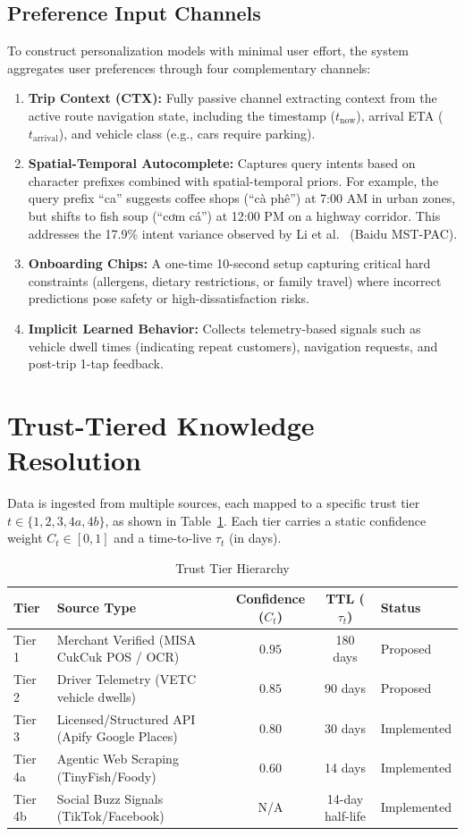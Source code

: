 \documentclass[acmsmall,screen]{acmart}
\begin{document}
\subsection{Preference Input Channels}
To construct personalization models with minimal user effort, the system aggregates user preferences through four complementary channels:
\begin{enumerate}
    \item \textbf{Trip Context (CTX):} Fully passive channel extracting context from the active route navigation state, including the timestamp ($t_{\text{now}}$), arrival ETA ($t_{\text{arrival}}$), and vehicle class (e.g., cars require parking).
    \item \textbf{Spatial-Temporal Autocomplete:} Captures query intents based on character prefixes combined with spatial-temporal priors. For example, the query prefix ``ca'' suggests coffee shops (``cà phê'') at 7:00 AM in urban zones, but shifts to fish soup (``cơm cá'') at 12:00 PM on a highway corridor. This addresses the 17.9\% intent variance observed by Li et al.~\cite{li2020baidu} (Baidu MST-PAC).
    \item \textbf{Onboarding Chips:} A one-time 10-second setup capturing critical hard constraints (allergens, dietary restrictions, or family travel) where incorrect predictions pose safety or high-dissatisfaction risks.
    \item \textbf{Implicit Learned Behavior:} Collects telemetry-based signals such as vehicle dwell times (indicating repeat customers), navigation requests, and post-trip 1-tap feedback.
\end{enumerate}

\section{Trust-Tiered Knowledge Resolution}
\label{sec:resolver}
Data is ingested from multiple sources, each mapped to a specific trust tier $t \in \{1, 2, 3, 4a, 4b\}$, as shown in Table~\ref{tab:tiers}. Each tier carries a static confidence weight $C_t \in [0, 1]$ and a time-to-live $\tau_t$ (in days).

\begin{table}[h]
\centering
\caption{Trust Tier Hierarchy}
\label{tab:tiers}
\begin{tabular}{llccl}
\toprule
\textbf{Tier} & \textbf{Source Type} & \textbf{Confidence ($C_t$)} & \textbf{TTL ($\tau_t$)} & \textbf{Status} \\
\midrule
Tier 1 & Merchant Verified (MISA CukCuk POS / OCR) & $0.95$ & 180 days & Proposed \\
Tier 2 & Driver Telemetry (VETC vehicle dwells) & $0.85$ & 90 days & Proposed \\
Tier 3 & Licensed/Structured API (Apify Google Places) & $0.80$ & 30 days & Implemented \\
Tier 4a & Agentic Web Scraping (TinyFish/Foody) & $0.60$ & 14 days & Implemented \\
Tier 4b & Social Buzz Signals (TikTok/Facebook) & N/A & 14-day half-life & Implemented \\
\bottomrule
\end{tabular}
\end{table}
\end{document}

